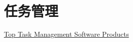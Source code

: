 \section{任务管理}
\href{http://www.capterra.com/task-management-software/}{Top Task Management
Software Products}
